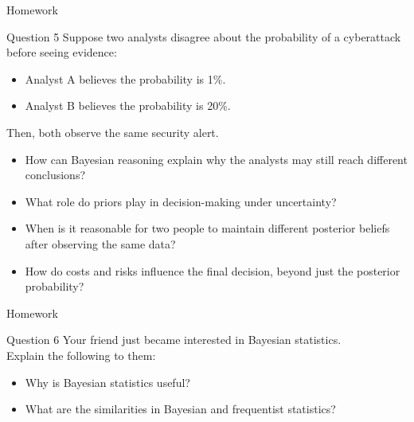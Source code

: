\documentclass[12pt]{beamer}
\begin{document}
{%
\begin{frame}{Homework}
\begin{block}{Question 5}
Suppose two analysts disagree about the probability of a cyberattack before seeing evidence:
\begin{itemize}
\item Analyst A believes the probability is 1\%.
\item Analyst B believes the probability is 20\%.
\end{itemize}
Then, both observe the same security alert.
\begin{itemize}
\item[a.] How can Bayesian reasoning explain why the analysts may still reach different conclusions?
\item[b.] What role do priors play in decision-making under uncertainty?
\item[c.] When is it reasonable for two people to maintain different posterior beliefs after observing the same data?
\item[d.] How do costs and risks influence the final decision, beyond just the posterior probability?
\end{itemize}
\end{block}
\end{frame}

\begin{frame}{Homework}
\begin{block}{Question 6
}
Your friend just became interested in Bayesian statistics.\\
Explain the following to them:
\begin{itemize}
\item[a.] Why is Bayesian statistics useful?
\item[b.] What are the similarities in Bayesian and frequentist statistics?
\end{itemize}
\end{block}
\end{frame}
}
\end{document}
